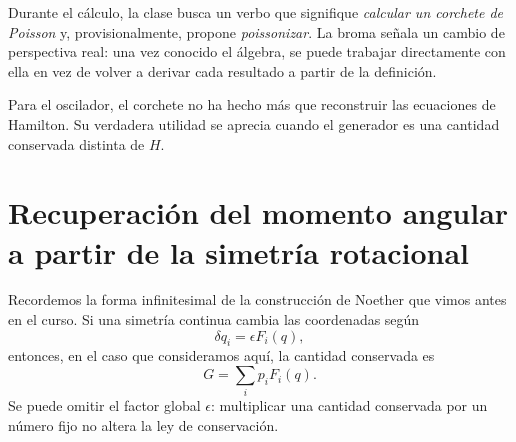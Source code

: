 Durante el cálculo, la clase busca un verbo que signifique
\emph{calcular un corchete de Poisson} y, provisionalmente, propone
\emph{poissonizar}. La broma señala un cambio de perspectiva real: una vez conocido el álgebra, se puede trabajar directamente con ella en vez de volver a derivar cada resultado a partir de la definición.

\begin{classroomqa}
\end{classroomqa}

\begin{classroomqa}
\end{classroomqa}

Para el oscilador, el corchete no ha hecho más que reconstruir las ecuaciones de Hamilton. Su verdadera utilidad se aprecia cuando el generador es una cantidad conservada distinta de \(H\).

\section{Recuperación del momento angular a partir de la simetría rotacional}

Recordemos la forma infinitesimal de la construcción de Noether que vimos antes en el curso. Si una simetría continua cambia las coordenadas según
\begin{equation}
  \delta q_i=\epsilon F_i(q),
  \label{eq:l8-noether-variation}
\end{equation}
entonces, en el caso que consideramos aquí, la cantidad conservada es
\begin{equation}
  G=\sum_i p_iF_i(q).
  \label{eq:l8-noether-charge}
\end{equation}
Se puede omitir el factor global \(\epsilon\): multiplicar una cantidad conservada por un número fijo no altera la ley de conservación.

